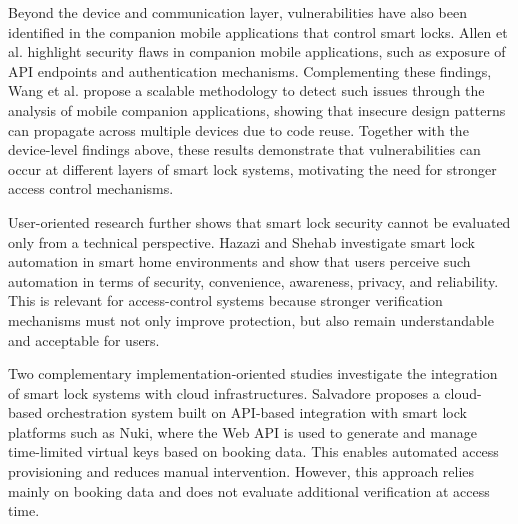 Beyond the device and communication layer, vulnerabilities have also been identified in the companion mobile applications that control smart locks. Allen et al. \cite{allen2024androidiot} highlight security flaws in companion mobile applications, such as exposure of API endpoints and authentication mechanisms. Complementing these findings, Wang et al. \cite{wang2019mirror} propose a scalable methodology to detect such issues through the analysis of mobile companion applications, showing that insecure design patterns can propagate across multiple devices due to code reuse. Together with the device-level findings above, these results demonstrate that vulnerabilities can occur at different layers of smart lock systems, motivating the need for stronger access control mechanisms.

User-oriented research further shows that smart lock security cannot be evaluated only from a technical perspective. Hazazi and Shehab \cite{hazazi2024automation} investigate smart lock automation in smart home environments and show that users perceive such automation in terms of security, convenience, awareness, privacy, and reliability. This is relevant for access-control systems because stronger verification mechanisms must not only improve protection, but also remain understandable and acceptable for users.


Two complementary implementation-oriented studies investigate the integration of smart lock systems with cloud infrastructures. Salvadore \cite{salvadore2022smartlocks} proposes a cloud-based orchestration system built on API-based integration with smart lock platforms such as Nuki, where the Web API is used to generate and manage time-limited virtual keys based on booking data. This enables automated access provisioning and reduces manual intervention. However, this approach relies mainly on booking data and does not evaluate additional verification at access time.

